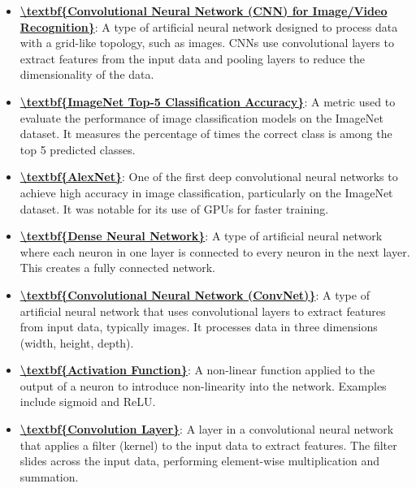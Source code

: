 \documentclass{article}%
\begin{document}
\begin{itemize}[leftmargin=*]%
\item \href{https://www.math.purdue.edu/~yipn/351/09L1-cnn.pdf#page=2}{\textbf{\textbackslash{}textbf\{Convolutional Neural Network (CNN) for Image/Video Recognition\}}}: A type of artificial neural network designed to process data with a grid-like topology, such as images. CNNs use convolutional layers to extract features from the input data and pooling layers to reduce the dimensionality of the data.%
\item \href{https://www.math.purdue.edu/~yipn/351/09L1-cnn.pdf#page=3}{\textbf{\textbackslash{}textbf\{ImageNet Top{-}5 Classification Accuracy\}}}: A metric used to evaluate the performance of image classification models on the ImageNet dataset. It measures the percentage of times the correct class is among the top 5 predicted classes.%
\item \href{https://www.math.purdue.edu/~yipn/351/09L1-cnn.pdf#page=3}{\textbf{\textbackslash{}textbf\{AlexNet\}}}: One of the first deep convolutional neural networks to achieve high accuracy in image classification, particularly on the ImageNet dataset. It was notable for its use of GPUs for faster training.%
\item \href{https://www.math.purdue.edu/~yipn/351/09L1-cnn.pdf#page=4}{\textbf{\textbackslash{}textbf\{Dense Neural Network\}}}: A type of artificial neural network where each neuron in one layer is connected to every neuron in the next layer. This creates a fully connected network.%
\item \href{https://www.math.purdue.edu/~yipn/351/09L1-cnn.pdf#page=4}{\textbf{\textbackslash{}textbf\{Convolutional Neural Network (ConvNet)\}}}: A type of artificial neural network that uses convolutional layers to extract features from input data, typically images. It processes data in three dimensions (width, height, depth).%
\item \href{https://www.math.purdue.edu/~yipn/351/09L1-cnn.pdf#page=5}{\textbf{\textbackslash{}textbf\{Activation Function\}}}: A non-linear function applied to the output of a neuron to introduce non-linearity into the network. Examples include sigmoid and ReLU.%
\item \href{https://www.math.purdue.edu/~yipn/351/09L1-cnn.pdf#page=6}{\textbf{\textbackslash{}textbf\{Convolution Layer\}}}: A layer in a convolutional neural network that applies a filter (kernel) to the input data to extract features. The filter slides across the input data, performing element-wise multiplication and summation.%

\end{itemize}
\end{document}

